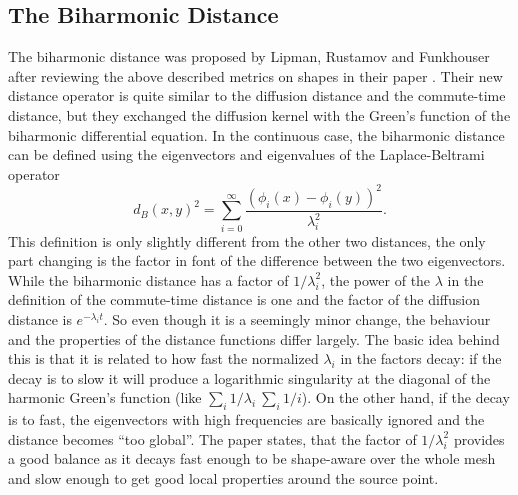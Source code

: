 \subsection{The Biharmonic Distance}
The biharmonic distance was proposed by Lipman, Rustamov and Funkhouser after reviewing the above described metrics on shapes in their paper \cite{lipman2010biharmonic}.
Their new distance operator is quite similar to the diffusion distance and the commute-time distance, but they exchanged the diffusion kernel with the Green's function of the biharmonic differential equation.
In the continuous case, the biharmonic distance can be defined using the eigenvectors and eigenvalues of the Laplace-Beltrami operator
\begin{equation}
	d_B(x,y)^2 = \sum_{i=0}^{\infty} \frac{(\phi_i(x) - \phi_i(y))^2}{\lambda_i^2}.
	\label{eq:biharmonic}
\end{equation}
This definition is only slightly different from the other two distances, the only part changing is the factor in font of the difference between the two eigenvectors.
While the biharmonic distance has a factor of $1/\lambda_i^2$, the power of the $\lambda$ in the definition of the commute-time distance is one and the factor of the diffusion distance is $e^{-\lambda_it}.$
So even though it is a seemingly minor change, the behaviour and the properties of the distance functions differ largely.
The basic idea behind this is that it is related to how fast the normalized $\lambda_i$ in the factors decay:
if the decay is to slow it will produce a logarithmic singularity at the diagonal of the harmonic Green's function (like $\sum_i 1/\lambda_i ~ \sum_i 1/i$).
On the other hand, if the decay is to fast, the eigenvectors with high frequencies are basically ignored and the distance becomes ``too global''.
The paper states, that the factor of $1/\lambda_i^2$ provides a good balance as it decays fast enough to be shape-aware over the whole mesh and slow enough to get good local properties around the source point.

